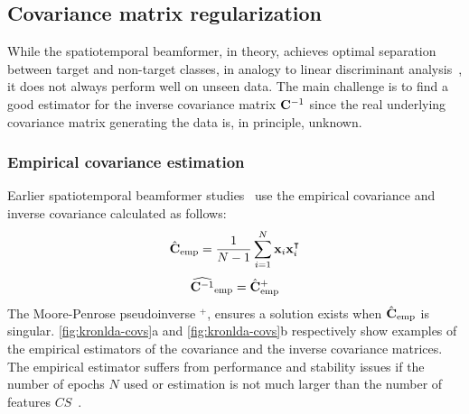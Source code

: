	\subsection{Covariance matrix regularization}
	While the spatiotemporal beamformer, in theory, achieves optimal separation
	between target and non-target classes, in analogy to linear discriminant
  analysis~\cite{Treder2016}, it does not always perform well on unseen data.
	The main challenge is to find a good estimator for the inverse covariance
  matrix $\mathbf{C}^{-1}$ since the real underlying covariance matrix generating the data is, in principle, unknown.

	\subsubsection{Empirical covariance estimation}
	\label{sec:empirical_covariance}
	Earlier spatiotemporal beamformer studies~\cite{Wittevrongel2016,
		Wittevrongel2016a, Wittevrongel2017, Wittevrongel2017a} use the empirical
	covariance and inverse covariance calculated as follows:
	\begin{equation}
    \hat{\mathbf{C}}_\text{emp} =
		\frac{1}{N-1}\sum^{N}_{i=1}\mathbf{x}_i\mathbf{x}_i^\intercal
		\label{eq:empirical_covariance}
	\end{equation}
	\begin{equation}
    \widehat{\mathbf{C}^{-1}}_\text{emp} = \hat{\mathbf{C}}_\text{emp}^+
		\label{eq:empirical_inverse_covariance}
	\end{equation}
	The Moore-Penrose pseudoinverse $^+$, ensures a solution exists when
  $\hat{\mathbf{C}}_\text{emp}$ is singular.
	\cref{fig:kronlda-covs}a and \cref{fig:kronlda-covs}b respectively show examples of the
	empirical estimators of the covariance and the inverse covariance matrices.
	The empirical estimator suffers from performance and
	stability issues if the number of epochs $N$ used or estimation is not much larger than the number of features $CS$~\cite{Stein1956,Khatri1987}.

